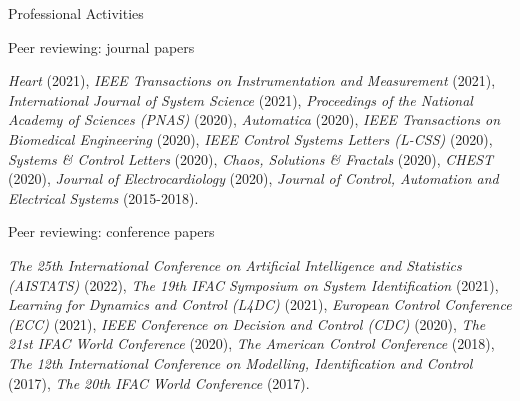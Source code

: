 \documentclass{resume} %
\begin{document}
\begin{rSection}{Professional Activities}

\begin{rSubsection}{Peer reviewing: journal papers}{}{}

\item  \hspace{3pt}
{\em Heart} (2021), %
{\em IEEE Transactions on Instrumentation and Measurement} (2021), %
{\em International Journal of System Science} (2021), %
{\em Proceedings of the National Academy of Sciences (PNAS)} (2020), %
{\em Automatica} (2020),  %
{\em IEEE Transactions on Biomedical Engineering} (2020), %
{\em IEEE Control Systems Letters (L-CSS)} (2020), %
{\em Systems \& Control Letters} (2020),
{\em Chaos, Solutions \& Fractals} (2020),
{\em CHEST} (2020), %
{\em  Journal of Electrocardiology} (2020), %
{\em Journal of Control, Automation and Electrical Systems} (2015-2018). %

\end{rSubsection}

\begin{rSubsection}{Peer reviewing: conference papers}{}{}

\item \hspace{3pt}
{\em The 25th International Conference on Artificial Intelligence and Statistics (AISTATS)} (2022),
{\em The 19th IFAC Symposium on System Identification} (2021), %
{\em Learning for Dynamics and Control (L4DC)} (2021), %
{\em European Control Conference (ECC)} (2021), %
{\em IEEE Conference on Decision and Control (CDC)} (2020), %
{\em The 21st IFAC World Conference} (2020), %
{\em The American Control Conference} (2018), %
{\em The 12th International Conference on Modelling, Identification and Control } (2017), %
{\em The 20th IFAC World Conference} (2017).  %

\end{rSubsection}


\end{rSection}
\end{document}
